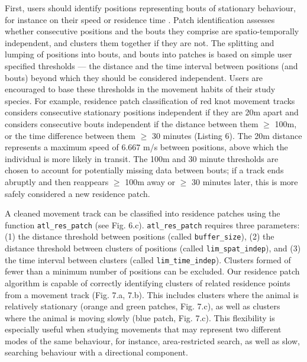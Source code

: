\documentclass[10pt,paper=a4,headings=standardclasses
]{scrartcl}
\begin{document}
First, users should identify positions representing bouts of stationary behaviour, for instance on their speed or residence time \citep{bracis2018}.
Patch identification assesses whether consecutive positions and the bouts they comprise are spatio-temporally independent, and clusters them together if they are not.
The splitting and lumping of positions into bouts, and bouts into patches is based on simple user specified thresholds --- the distance and the time interval between positions (and bouts) beyond which they should be considered independent.
Users are encouraged to base these thresholds in the movement habits of their study species.
For example, residence patch classification of red knot movement tracks considers consecutive stationary positions independent if they are 20m apart and considers consecutive bouts independent if the distance between them $\geq$ 100m, or the time difference between them $\geq$ 30 minutes (Listing 6).
The 20m distance represents a maximum speed of 6.667 m/s between positions, above which the individual is more likely in transit.
The 100m and 30 minute thresholds are chosen to account for potentially missing data between bouts; if a track ends abruptly and then reappears $\geq$ 100m away or $\geq$ 30 minutes later, this is more safely considered a new residence patch.

A cleaned movement track can be classified into residence patches using the function \texttt{atl\_res\_patch} (see Fig. 6.c).
\texttt{atl\_res\_patch} requires three parameters: (1) the distance threshold between positions (called \texttt{buffer\_size}), (2) the distance threshold between clusters of positions (called \texttt{lim\_spat\_indep}), and (3) the time interval between clusters (called \texttt{lim\_time\_indep}).
Clusters formed of fewer than a minimum number of positions can be excluded.
Our residence patch algorithm is capable of correctly identifying clusters of related residence points from a movement track (Fig. 7.a, 7.b).
This includes clusters where the animal is relatively stationary (orange and green patches, Fig. 7.c), as well as clusters where the animal is moving slowly (blue patch, Fig. 7.c).
This flexibility is especially useful when studying movements that may represent two different modes of the same behaviour, for instance, area-restricted search, as well as slow, searching behaviour with a directional component.
\end{document}

